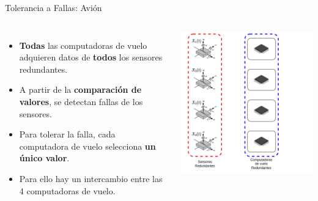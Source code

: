 \begin{frame}{Tolerancia a Fallas: Avión}
	\begin{columns}
			\begin{itemize}
				\item <3->\textbf{Todas} las computadoras de vuelo adquieren datos de \textbf{todos} los sensores redundantes.
				\item <4->A partir de la \textbf{comparación de valores}, se detectan fallas de los sensores.
				\item <5->Para tolerar la falla, cada computadora de vuelo selecciona \textbf{un único valor}.
				\item <6->Para ello hay un intercambio entre las 4 computadoras de vuelo.
			\end{itemize}
			\begin{overprint}
				\includegraphics[width=\textwidth]{img/adquieren_sensores_1.png}

\end{overprint}
\end{columns}
\end{frame}
